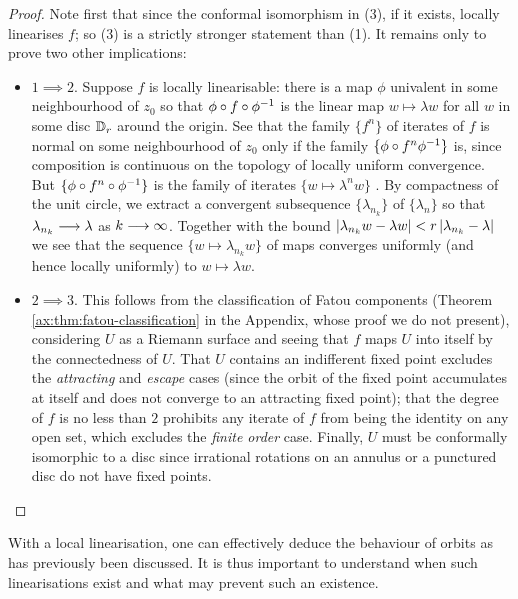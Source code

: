\documentclass[../main.tex]{subfiles}
\begin{document}
\begin{proof}
    Note first that since the conformal isomorphism in (3), if it exists, locally linearises $f$; so (3) is a strictly stronger statement than (1). It remains only to prove two other implications:
    \begin{itemize}
    \item \emph{$1 \implies 2.$} Suppose $f$ is locally linearisable: there is a map $\phi$ univalent in some neighbourhood of $z_0$ so that $\phi \circ f \circ \phi^{-1}$ is the linear map $w \mapsto \lambda w$ for all $w$ in some disc $\mathbb{D}_r$ around the origin. See that the family $\{f^n\}$ of iterates of $f$ is normal on some neighbourhood of $z_0$ only if the family  $\{\phi \circ f^n \phi^{-1} \}$ is, since composition is continuous on the topology of locally uniform convergence. But $\{\phi\circ f^n \circ \phi^{-1} \}$ is the family of iterates $\{w \mapsto \lambda^n w \}$ . By compactness of the unit circle, we extract a convergent subsequence $\{\lambda_{n_k}\}$ of $\{ \lambda_n \}$ so that $\lambda_{n_k} \longrightarrow \lambda$ as $k \longrightarrow \infty$. Together with the bound $\left|\lambda_{n_k} w - \lambda w\right| < r \left|\lambda_{n_k} - \lambda\right|$ we see that the sequence $\{ w \mapsto \lambda_{n_k} w\}$ of maps converges uniformly (and hence locally uniformly) to $w \mapsto \lambda w$.
    
    \item \emph{$2 \implies 3.$} This follows from the classification of Fatou components (Theorem \ref{ax:thm:fatou-classification} in the Appendix, whose proof we do not present), considering $U$ as a Riemann surface and seeing that $f$ maps $U$ into itself by the connectedness of $U$. That $U$ contains an indifferent fixed point excludes the \emph{attracting} and \emph{escape} cases (since the orbit of the fixed point accumulates at itself and does not converge to an attracting fixed point); that the degree of $f$ is no less than $2$ prohibits any iterate of $f$ from being the identity on any open set, which excludes the \emph{finite order} case. Finally, $U$ must be conformally isomorphic to a disc since irrational rotations on an annulus or a punctured disc do not have fixed points.
\end{itemize}
\end{proof}

With a local linearisation, one can effectively deduce the behaviour of orbits as has previously been discussed. It is thus important to understand when such linearisations exist and what may prevent such an existence.
\end{document}
